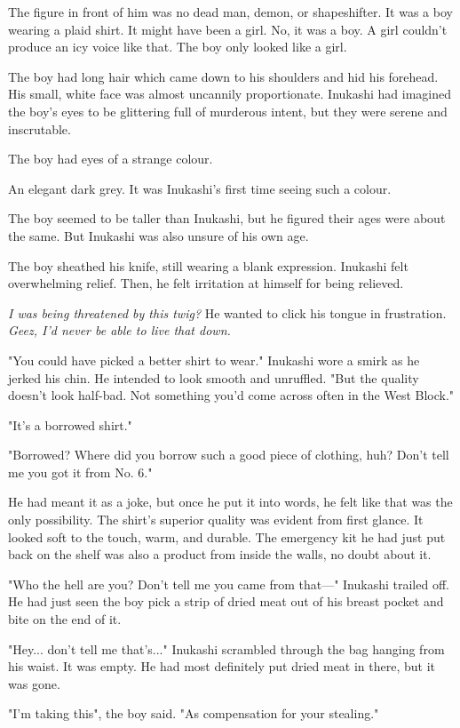 The figure in front of him was no dead man, demon, or shapeshifter. It
was a boy wearing a plaid shirt. It might have been a girl. No, it was a
boy. A girl couldn't produce an icy voice like that. The boy only looked
like a girl.

The boy had long hair which came down to his shoulders and hid his
forehead. His small, white face was almost uncannily proportionate.
Inukashi had imagined the boy's eyes to be glittering full of murderous
intent, but they were serene and inscrutable.

The boy had eyes of a strange colour.

An elegant dark grey. It was Inukashi's first time seeing such a colour.

The boy seemed to be taller than Inukashi, but he figured their ages
were about the same. But Inukashi was also unsure of his own age.

The boy sheathed his knife, still wearing a blank expression. Inukashi
felt overwhelming relief. Then, he felt irritation at himself for being
relieved.

\emph{I was being threatened by this twig?} He wanted to click his tongue in
frustration. \emph{Geez, I'd never be able to live that down.}

"You could have picked a better shirt to wear." Inukashi wore a smirk as
he jerked his chin. He intended to look smooth and unruffled. "But the
quality doesn't look half-bad. Not something you'd come across often in
the West Block."

"It's a borrowed shirt."

"Borrowed? Where did you borrow such a good piece of clothing, huh?
Don't tell me you got it from No. 6."

He had meant it as a joke, but once he put it into words, he felt like
that was the only possibility. The shirt's superior quality was evident
from first glance. It looked soft to the touch, warm, and durable. The
emergency kit he had just put back on the shelf was also a product from
inside the walls, no doubt about it.

"Who the hell are you? Don't tell me you came from that---" Inukashi
trailed off. He had just seen the boy pick a strip of dried meat out of
his breast pocket and bite on the end of it.

"Hey... don't tell me that's..." Inukashi scrambled through the bag
hanging from his waist. It was empty. He had most definitely put dried
meat in there, but it was gone.

"I'm taking this", the boy said. "As compensation for your stealing."

